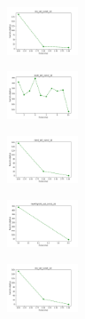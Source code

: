 \vspace*{\fill}
\newpage
\vspace*{\fill}

\begin{figure}[H]
    \centering
    \begin{subfigure}
        \centering
        \includegraphics[width=0.234\textwidth]{img/copkm/iris_set_const_10_949004259_cost.png}
    \end{subfigure}
    \hfill
    \begin{subfigure}
        \centering
        \includegraphics[width=0.234\textwidth]{img/copkm/ecoli_set_const_10_949004259_cost.png}
    \end{subfigure}
    \hfill
    \begin{subfigure}
        \centering
        \includegraphics[width=0.234\textwidth]{img/copkm/rand_set_const_10_949004259_cost.png}
    \end{subfigure}
    \hfill
    \begin{subfigure}
        \centering
        \includegraphics[width=0.234\textwidth]{img/copkm/newthyroid_set_const_10_949004259_cost.png}
    \end{subfigure}
    \hfill
    \begin{subfigure}
        \centering
        \includegraphics[width=0.234\textwidth]{img/copkm/iris_set_const_10_589741062_cost.png}

\end{subfigure}
\end{figure}
